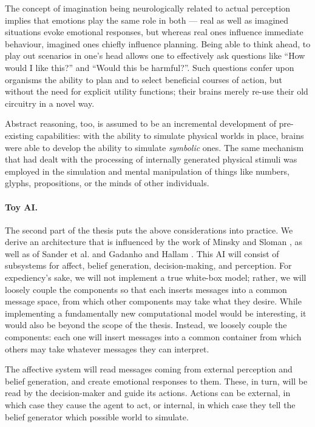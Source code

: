 The concept of imagination being neurologically related to actual perception implies that emotions play the same role in both --- real as well as imagined situations evoke emotional responses, but whereas real ones influence immediate behaviour, imagined ones chiefly influence planning. Being able to think ahead, to play out scenarios in one's head allows one to effectively ask questions like ``How would I like this?'' and ``Would this be harmful?''. Such questions confer upon organisms the ability to plan and to select beneficial courses of action, but without the need for explicit utility functions; their brains merely re-use their old circuitry in a novel way.

Abstract reasoning, too, is assumed to be an incremental development of pre-existing capabilities: with the ability to simulate physical worlds in place, brains were able to develop the ability to simulate {\em symbolic} ones. The same mechanism that had dealt with the processing of internally generated physical stimuli was employed in the simulation and mental manipulation of things like numbers, glyphs, propositions, or the minds of other individuals.

\paragraph{Toy AI.} The second part of the thesis puts the above considerations into practice. We derive an architecture that is influenced by the work of Minsky \cite{societyOfMind} and Sloman \cite{sloman1993,sloman1997}, as well as of Sander et al. \cite{DBLP:journals/nn/SanderGS05} and Gadanho and Hallam \cite{DBLP:journals/adb/GadanhoH01}. This AI will consist of subsystems for affect, belief generation, decision-making, and perception. For expediency's sake, we will not implement a true white-box model; rather, we will loosely couple the components so that each inserts messages into a common message space, from which other components may take what they desire. While implementing a fundamentally new computational model would be interesting, it would also be beyond the scope of the thesis. Instead, we loosely couple the components: each one will insert messages into a common container from which others may take whatever messages they can interpret.

The affective system will read messages coming from external perception and belief generation, and create emotional responses to them. These, in turn, will be read by the decision-maker and guide its actions. Actions can be external, in which case they cause the agent to act, or internal, in which case they tell the belief generator which possible world to simulate.

